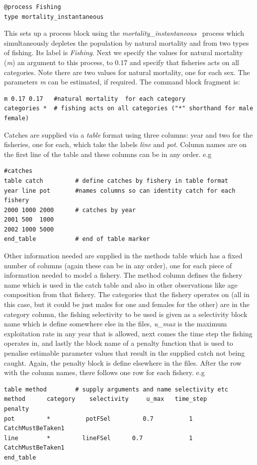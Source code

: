 {\small{\begin{verbatim}
@process Fishing
type mortality_instantaneous
\end{verbatim}}}
This sets up a process block using the \textit{mortality\_instantaneous}~ process which simultaneously depletes the population by natural mortality and from two types of fishing. Its label is \textit{Fishing}.
Next we specify the values for natural mortality (\textit{m}) an argument to this process, to 0.17 and specify that fisheries acts on all categories. Note there are two values for natural mortality, one for each sex. The parameters \textit{m} can be estimated, if required. The command block fragment is:
{\small{\begin{verbatim}
m 0.17 0.17   #natural mortality  for each category
categories *  # fishing acts on all categories ("*" shorthand for male female)
\end{verbatim}}}
Catches are supplied via a \textit{table} format using three columns: year and two for the fisheries, one for each, which take the labels \textit{line} and \textit{pot}. Column names are on the first line of the table and these columns can be in any order. e.g

{\small{\begin{verbatim}
#catches
table catch         # define catches by fishery in table format
year line pot       #names columns so can identity catch for each fishery
2000 1000 2000      # catches by year
2001 500  1000
2002 1000 5000
end_table           # end of table marker
\end{verbatim}}}
 Other information needed are supplied in the methods table which has a fixed number of columns (again these can be in any order), one for each piece of information needed to model a fishery. The method column defines the fishery name which is used in the catch table and also in other observations like age composition from that fishery. The categories that the fishery operates on (all in this case, but it could be just males for one and females for the other) are in the category column, the fishing selectivity to be used is given as a selectivity block name which is define somewhere else in the files,  \textit{u\_max} is the maximum exploitation rate in any year that is allowed, next comes the time step the fishing operates in, and lastly the block name of a penalty function that is used to penalise estimable parameter values that result in the supplied catch not being caught. Again, the penalty block is define elsewhere in the files. After the  row with the column names, there follows one row for each fishery. e.g
{\small{\begin{verbatim}
table method        # supply arguments and name selectivity etc
method  	category 	selectivity 	u_max 	time_step 		penalty
pot        	*  	       potFSel		   0.7 			1 	CatchMustBeTaken1
line     	*  	      lineFSel 	    0.7 			1 	CatchMustBeTaken1
end_table

\end{verbatim}}}

